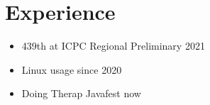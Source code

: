 
\section{\textbf{Experience}}
\begin{itemize}[leftmargin=*,labelsep=0.5em]
  \item 439th at ICPC Regional Preliminary 2021
  \item Linux usage since 2020
  \item Doing Therap Javafest now
\end{itemize}

